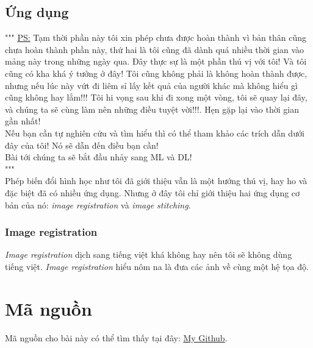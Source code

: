 \documentclass{article}
\begin{document}
\subsection{Ứng dụng}
"""
\underline{PS:} Tạm thời phần này tôi xin phép chưa được hoàn thành vì bản thân cũng chưa hoàn thành phần này, thứ hai là tôi cũng đã dành quá nhiều thời gian vào mảng này trong những ngày qua. Đây thực sự là một phần thú vị với tôi! Và tôi cũng có kha khá ý tưởng ở đây! Tôi cũng không phải là không hoàn thành được, nhưng nếu lúc này vứt đi liêm sỉ lấy kết quả của người khác mà không hiểu gì cũng không hay lắm!!! Tôi hi vọng sau khi đi xong một vòng, tôi sẽ quay lại đây, và chúng ta sẽ cùng làm nên những điều tuyệt vời!!!. Hẹn gặp lại vào thời gian gần nhất! 
\\ Nếu bạn cần tự nghiên cứu và tìm hiểu thì có thể tham khảo các trích dẫn dưới đây của tôi! Nó sẽ dẫn đến điều bạn cần!\\
Bài tới chúng ta sẽ bắt đầu nhảy sang ML và DL!\\ """\\
Phép biến đổi hình học như tôi đã giới thiệu vẫn là một hướng thú vị, hay ho và đặc biệt đã có nhiều ứng dụng. Nhưng ở đây tôi chỉ giới thiệu hai ứng dụng cơ bản của nó: \textit{image registration} và \textit{image stitching}.
\subsubsection{Image registration}
\textit{Image registration} dịch sang tiếng việt khá không hay nên tôi sẽ không dùng tiếng việt. \textit{Image registration} hiểu nôm na là đưa các ảnh về cùng một hệ tọa độ. 
\section{Mã nguồn}
Mã nguồn cho bài này có thể tìm thấy tại đây: \href{https://github.com/thuantn210823/Computer-Vision-IPSAL-LAB-}{My Github}.

\newpage
\end{document}

